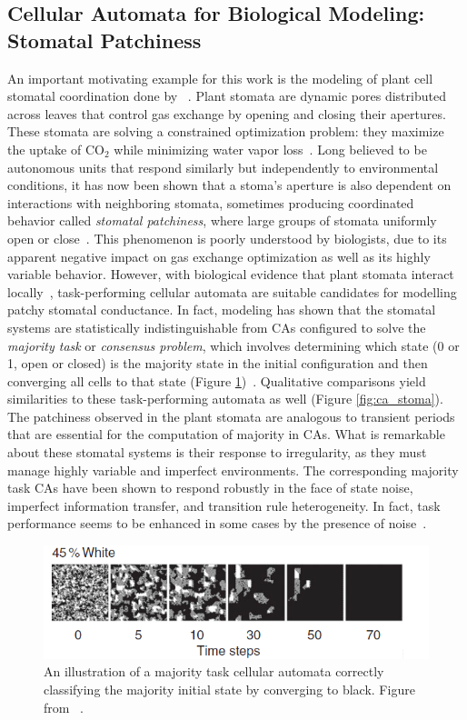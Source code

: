 \documentclass[a4paper,11pt]{article}
\begin{document}
\subsection{Cellular Automata for Biological Modeling: Stomatal Patchiness}
\label{subsec:Stoma}
An important motivating example for this work is the modeling of plant cell stomatal coordination done by \citeauthor{pe04}~\cite{pe04}. Plant stomata are dynamic pores distributed across leaves that control gas exchange by opening and closing their apertures. These stomata are solving a constrained optimization problem: they maximize the uptake of CO$_\text{2}$ while minimizing water vapor loss~\cite{mo07,we11}. Long believed to be autonomous units that respond similarly but independently to environmental conditions, it has now been shown that a stoma's aperture is also dependent on interactions with neighboring stomata, sometimes producing coordinated behavior called \textit{stomatal patchiness}, where large groups of stomata uniformly open or close~\cite{pe04}. This phenomenon is poorly understood by biologists, due to its apparent negative impact on gas exchange optimization as well as its highly variable behavior. However, with biological evidence that plant stomata interact locally~\cite{pe04}, task-performing cellular automata are suitable candidates for modelling patchy stomatal conductance. In fact, modeling has shown that the stomatal systems are statistically indistinguishable from CAs configured to solve the \textit{majority task} or \textit{consensus problem}, which involves determining which state (0 or 1, open or closed) is the majority state in the initial configuration and then converging all cells to that state (Figure \ref{fig:maj_task})~\cite{gr15}. Qualitative comparisons yield similarities to these task-performing automata as well (Figure \ref{fig:ca_stoma}). The patchiness observed in the plant stomata are analogous to transient periods that are essential for the computation of majority in CAs. What is remarkable about these stomatal systems is their response to irregularity, as they must manage highly variable and imperfect environments. The corresponding majority task CAs have been shown to respond robustly in the face of state noise, imperfect information transfer, and transition rule heterogeneity. In fact, task performance seems to be enhanced in some cases by the presence of noise~\cite{me07}.

\begin{figure}[htp]
	\centering
	\includegraphics[width=1.0\textwidth]{mo07_fig3_maj_task.png}
	\caption[Majority Task CA]{
	An illustration of a majority task cellular automata correctly classifying the majority initial state by converging to black. Figure from \citeauthor{mo07}~\cite{mo07}.
	}
	\label{fig:maj_task}
\end{figure}
\end{document}
